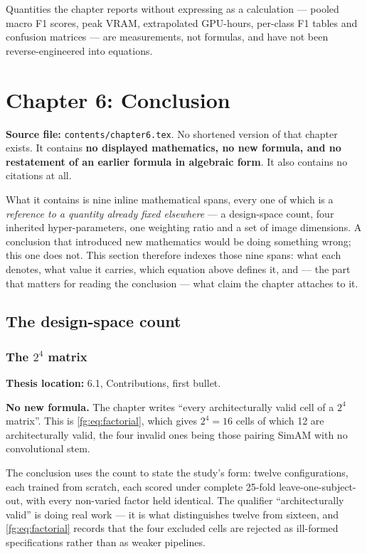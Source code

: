 \documentclass[11pt,a4paper]{article}
\numberwithin{equation}{section}
\begin{document}
Quantities the chapter reports without expressing as a calculation --- pooled
macro F1 scores, peak VRAM, extrapolated GPU-hours, per-class F1 tables and
confusion matrices --- are measurements, not formulas, and have not been
reverse-engineered into equations.

\section{Chapter 6: Conclusion}
\label{fg6:chapter6}

\textbf{Source file:} \texttt{contents/chapter6.tex}. No shortened version of
that chapter exists. It contains \textbf{no displayed mathematics, no new
formula, and no restatement of an earlier formula in algebraic form}. It also
contains no citations at all.

What it contains is nine inline mathematical spans, every one of which is a
\emph{reference to a quantity already fixed elsewhere} --- a design-space
count, four inherited hyper-parameters, one weighting ratio and a set of image
dimensions. A conclusion that introduced new mathematics would be doing
something wrong; this one does not. This section therefore indexes those nine
spans: what each denotes, what value it carries, which equation above defines
it, and --- the part that matters for reading the conclusion --- what claim the
chapter attaches to it.

\subsection{The design-space count}

\subsubsection{The \texorpdfstring{$2^4$}{2\^{}4} matrix}
\label{fg6:factorial}
\textbf{Thesis location:} 6.1, Contributions, first bullet.

\textbf{No new formula.} The chapter writes ``every architecturally valid cell
of a $2^4$ matrix''. This is \eqref{fg:eq:factorial}, which gives $2^4 = 16$ cells of
which 12 are architecturally valid, the four invalid ones being those pairing
SimAM with no convolutional stem.

The conclusion uses the count to state the study's form: twelve configurations,
each trained from scratch, each scored under complete 25-fold
leave-one-subject-out, with every non-varied factor held identical. The
qualifier ``architecturally valid'' is doing real work --- it is what
distinguishes twelve from sixteen, and \eqref{fg:eq:factorial} records that the four
excluded cells are rejected as ill-formed specifications rather than as
weaker pipelines.
\end{document}
